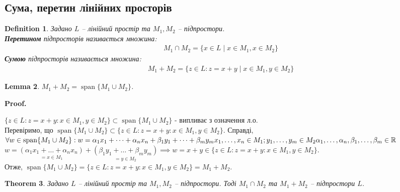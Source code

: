 \documentclass[a4paper, 10pt]{article}
\makeatletter
\theoremstyle{theoremdd}
\newtheorem{theorem}{Theorem}[subsection]
\newtheorem{definition}[theorem]{Definition}
\newtheorem{lemma}[theorem]{Lemma}
\DeclareMathOperator{\linspan}{span}
\renewenvironment{proof}[1][Proof.\\]{\par
\pushQED{\hfill \qed}%
\normalfont \topsep6\p@\@plus6\p@\relax
\trivlist
\item\relax
{\bfseries
#1\@addpunct{.}}\hspace\labelsep\ignorespaces
}{%
\popQED\endtrivlist\@endpefalse
}
\makeatother
\begin{document}
	\subsection{Сума, перетин лінійних просторів}
	\begin{definition}
	Задано $L$ -- лінійний простір та $M_1, M_2$ -- підпростори.\\
	\textbf{Перетином} підпросторів називається множина:
	\begin{align*}
	M_1 \cap M_2 = \{x \in L \mid x \in M_1, x \in M_2 \}
	\end{align*}
	\textbf{Сумою} підпросторів називається множина:
	\begin{align*}
	M_1 + M_2 = \{z \in L: z = x + y \mid x \in M_1, y \in M_2\}
	\end{align*}
	\end{definition}
	
	\begin{lemma}
	$M_1 + M_2 = \linspan\{M_1 \cup M_2\}$.
	\end{lemma}
	
	\begin{proof}
	$\{z \in L: z = x+y: x \in M_1, y \in M_2\} \subset \linspan\{M_1 \cup M_2\}$ - випливає з означення л.о.\\
	Перевіримо, що $\linspan\{M_1 \cup M_2\} \subset \{z \in L: z = x+y: x \in M_1, y \in M_2\}$. Справді,\\
	$\forall w \in \linspan\{M_1 \cup M_2\}: w = \alpha_1 x_1 + \dots + \alpha_n x_n + \beta_1 y_1 + \dots + \beta_m y_m \\ x_1, \dots, x_n \in M_1; y_1, \dots, y_m \in M_2 \\ \alpha_1, \dots, \alpha_n, \beta_1, \dots, \beta_m \in \mathbb{R}$\\
	$w = \underset{= x \in M_1}{(\alpha_1 x_1 + \dots + \alpha_n x_n )}+ \underset{= y \in M_2}{(\beta_1 y_1 + \dots + \beta_m y_m)} \implies w = x + y \in \{z \in L: z = x+y: x \in M_1, y \in M_2\}$.\\
	Отже, $\linspan\{M_1 \cup M_2\} = \{z \in L: z = x+y: x \in M_1, y \in M_2\} = M_1 + M_2$.
	\end{proof}
	
	\begin{theorem}
	Задано $L$ -- лінійний простір та $M_1,M_2$ -- підпростори. Тоді $M_1 \cap M_2$ та $M_1 + M_2$ -- підпростори $L$.
	\end{theorem}
	
\end{document}

